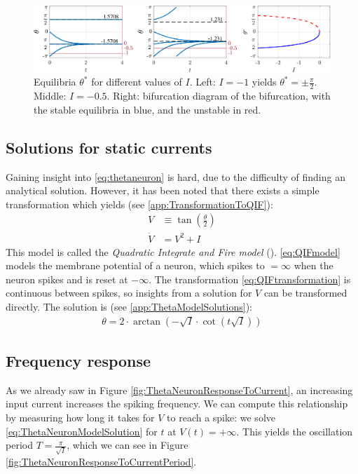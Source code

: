 \begin{figure}[H]
\centering
\includegraphics[width = \textwidth]{../Figures/ThetaModelEquilibriumPoints.pdf}
\caption{Equilibria $\theta^{\ast}$ for different values of $I$. Left: $I = -1$ yields $\theta^{\ast} = \pm \frac{\pi}{2}$. Middle: $I = -0.5$. Right: bifurcation diagram of the \SNIC bifurcation, with the stable equilibria in blue, and the unstable in red.}
\label{fig:ThetaModelEquilibriumPoints}
\end{figure}


\subsection{Solutions for static currents} \label{sec:TheThetaNeuronModelSolutions}
Gaining insight into \eqref{eq:thetaneuron} is hard, due to the difficulty of finding an analytical solution. However, it has been noted that there exists a simple transformation which yields (see \ref{app:TransformationToQIF}):
\begin{align}
V &\equiv \tan \left( \frac{\theta}{2} \right) \label{eq:QIFtransformation} \\
\dot{V} &= V^2 + I \label{eq:QIFmodel}
\end{align}
This model is called the \textsl{Quadratic Integrate and Fire model} (\QIF). \eqref{eq:QIFmodel} models the membrane potential of a neuron, which spikes to $=\infty$ when the neuron spikes and is reset at $-\infty$. The transformation \eqref{eq:QIFtransformation} is continuous between spikes, so insights from a solution for $V$ can be transformed directly. The solution is (see \ref{app:ThetaModelSolutions}):
\begin{align}
\theta = 2 \cdot \arctan \left(-\sqrt{I} \cdot \cot (t \sqrt{I}) \right) \label{eq:ThetaNeuronModelSolution}
\end{align}


\subsection{Frequency response} \label{sec:TheThetaNeuronModelFrequencyResponse}
As we already saw in Figure \ref{fig:ThetaNeuronResponseToCurrent}, an increasing input current increases the spiking frequency. We can compute this relationship by measuring how long it takes for $V$ to reach a spike: we solve \eqref{eq:ThetaNeuronModelSolution} for $t$ at $V(t) = +\infty$. This yields the oscillation period $T = \frac{\pi}{\sqrt{I}}$, which we can see in Figure \ref{fig:ThetaNeuronResponseToCurrentPeriod}.

